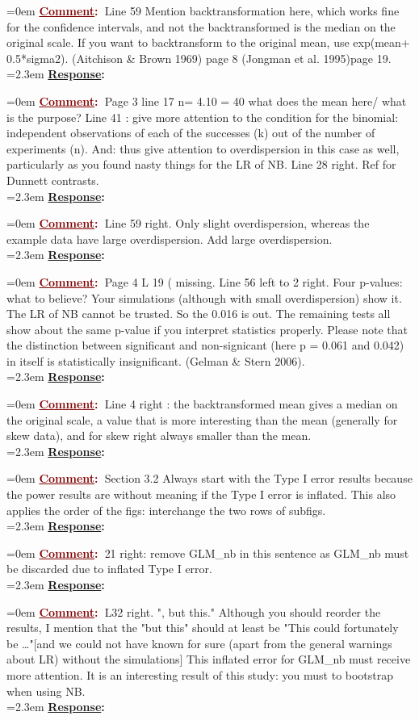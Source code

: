 \documentclass[12pt]{article}
\newcommand{\comment}[0]{\vspace{1em} \noindent \hangindent=0em \textbf{\textcolor{Maroon}{\uline{Comment}:~}}}
\newcommand{\response}[0]{\\\vspace{0.1em} \hangindent=2.3em \textbf{\textcolor{NavyBlue}{\uline{Response}:~}}}
\begin{document}
\comment Line 59 Mention backtransformation here, which works fine for the confidence intervals, and not the backtransformed is the median on the original scale. If you want to backtransform to the original mean, use exp(mean+ 0.5*sigma2). (Aitchison \& Brown 1969) page 8 (Jongman et al. 1995)page 19. 
\response

\comment Page 3 line 17 n= 4.10 = 40 what does the mean here/ what is the purpose?
Line 41 : give more attention to the condition for the binomial: independent observations of each of the successes (k) out of the number of experiments (n).
And: thus give attention to overdispersion in this case as well, particularly as you found nasty things for the LR of  NB.
Line 28 right. Ref for Dunnett contrasts.
\response

\comment Line 59 right. Only slight overdispersion, whereas the example data have large  overdispersion. Add large overdispersion.
\response

\comment Page 4 
L 19 ( missing.
Line 56 left to 2 right. Four p-values: what to believe? Your simulations (although with small overdispersion) show it. The LR of NB cannot be trusted. So the 0.016 is out. The remaining tests all show about the same p-value if you interpret statistics properly. Please note that the distinction between significant and non-signicant (here p = 0.061 and 0.042) in itself is statistically insignificant. (Gelman \& Stern 2006).
\response

\comment Line 4 right : the backtransformed mean gives a median on the original scale, a value that is more interesting than the mean (generally for skew data),  and for skew right always smaller than the mean.
\response

\comment Section 3.2
Always start with the Type I error results because the power results are without meaning if the Type I error is inflated. This also applies the order of the figs: interchange the two rows of subfigs. 
\response

\comment 21 right: remove GLM\_nb in this sentence as GLM\_nb must be discarded due to inflated Type I error.
\response

\comment L32 right. ", but this." Although you should reorder the results, I mention that the "but this" should at least be "This could fortunately be …"[and we could not have known for sure (apart from the general warnings about LR) without the simulations] This inflated error for GLM\_nb must receive more attention. It is an interesting result of this study: you must to bootstrap when using NB.
\response
\end{document}
